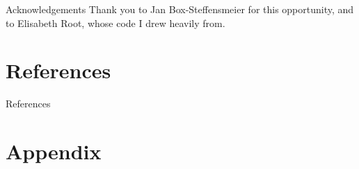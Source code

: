 \documentclass[aspectratio = 169, 12pt]{beamer}\usepackage[]{graphicx}\usepackage[]{color}
\begin{document}
\begin{frame}{Acknowledgements}
Thank you to Jan Box-Steffensmeier for this opportunity, and to Elisabeth Root, whose code I drew heavily from.
\end{frame}


\section*{References}     %

\begin{frame}{References}

\end{frame}

\section*{Appendix}     %
\subsection*{}

\begin{frame}{}
\end{frame}
\end{document}
